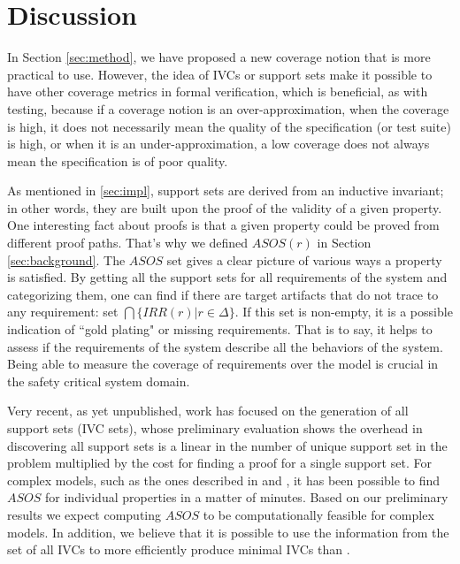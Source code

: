 \section{Discussion}
\label{sec:discussion}

In Section \ref{sec:method}, we have proposed a new coverage notion that 
is more practical to use. However, the idea of IVCs or support sets make 
it possible to have other coverage metrics in formal verification, which is beneficial, as with testing, because if a
coverage notion is an over-approximation, when the coverage
 is high, it does not necessarily mean the quality of
 the specification (or test suite) is high, or when it is an under-approximation, a low coverage does not always mean the specification is of poor quality.
 
 As mentioned in \ref{sec:impl}, support sets are derived from an inductive invariant; in other words, they are built upon the proof of the validity of a given property. One interesting fact about proofs
  is that a given property could be proved from different proof paths. That's why we defined $ASOS(r)$ in Section \ref{sec:background}. The $ASOS$ set gives a clear picture of various ways a property is satisfied. By getting all the support sets for all requirements of the system and categorizing them, one can find if there are target artifacts that do not trace to any requirement: set $\bigcap \{IRR (r) | r \in \Delta \}$.  If this set is non-empty, it is a possible indication of ``gold plating" or missing requirements. That is to say, it helps to assess if the requirements of the system describe all the behaviors of the system. Being able to measure the coverage of requirements over the model is crucial in the safety critical system domain.

Very recent, as yet unpublished, work has focused on the
generation of all support sets (IVC sets), whose preliminary evaluation 
shows the overhead in discovering all support sets is a linear in the
number of unique support set in the problem multiplied by the cost
for finding a proof for a single support set. For complex models, such
as the ones described in \cite {QFCS15:backes} and \cite{hilt2013}, it has been possible to
find $ASOS$ for individual properties in a matter of minutes.
Based on our preliminary results we expect computing $ASOS$ to be computationally feasible for complex models. In
addition, we believe that it is possible to use the information
from the set of all IVCs to more efficiently produce minimal
IVCs than \ucbfalg. 

